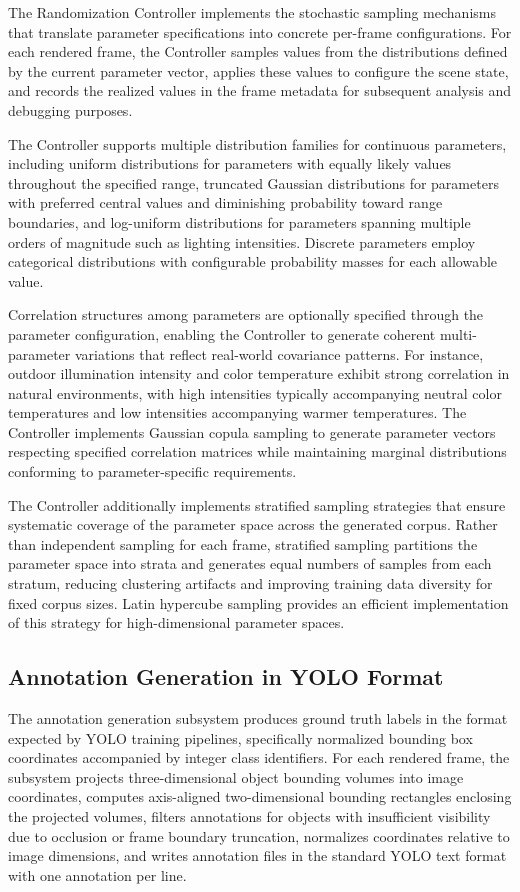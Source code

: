 The Randomization Controller implements the stochastic sampling mechanisms that translate parameter specifications into concrete per-frame configurations. For each rendered frame, the Controller samples values from the distributions defined by the current parameter vector, applies these values to configure the scene state, and records the realized values in the frame metadata for subsequent analysis and debugging purposes.

The Controller supports multiple distribution families for continuous parameters, including uniform distributions for parameters with equally likely values throughout the specified range, truncated Gaussian distributions for parameters with preferred central values and diminishing probability toward range boundaries, and log-uniform distributions for parameters spanning multiple orders of magnitude such as lighting intensities. Discrete parameters employ categorical distributions with configurable probability masses for each allowable value.

Correlation structures among parameters are optionally specified through the parameter configuration, enabling the Controller to generate coherent multi-parameter variations that reflect real-world covariance patterns. For instance, outdoor illumination intensity and color temperature exhibit strong correlation in natural environments, with high intensities typically accompanying neutral color temperatures and low intensities accompanying warmer temperatures. The Controller implements Gaussian copula sampling to generate parameter vectors respecting specified correlation matrices while maintaining marginal distributions conforming to parameter-specific requirements.

The Controller additionally implements stratified sampling strategies that ensure systematic coverage of the parameter space across the generated corpus. Rather than independent sampling for each frame, stratified sampling partitions the parameter space into strata and generates equal numbers of samples from each stratum, reducing clustering artifacts and improving training data diversity for fixed corpus sizes. Latin hypercube sampling provides an efficient implementation of this strategy for high-dimensional parameter spaces.

\subsection{Annotation Generation in YOLO Format}

The annotation generation subsystem produces ground truth labels in the format expected by YOLO training pipelines, specifically normalized bounding box coordinates accompanied by integer class identifiers. For each rendered frame, the subsystem projects three-dimensional object bounding volumes into image coordinates, computes axis-aligned two-dimensional bounding rectangles enclosing the projected volumes, filters annotations for objects with insufficient visibility due to occlusion or frame boundary truncation, normalizes coordinates relative to image dimensions, and writes annotation files in the standard YOLO text format with one annotation per line.

